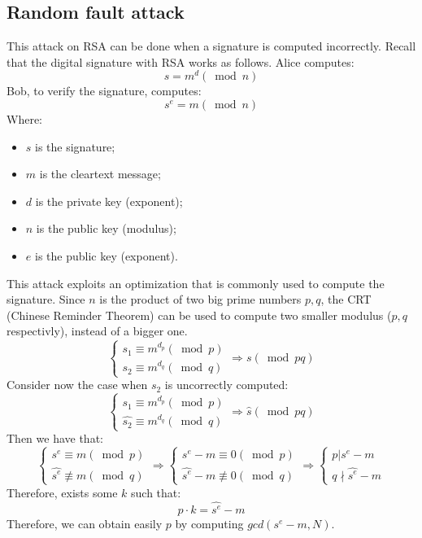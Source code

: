 \subsection{Random fault attack}
This attack on RSA can be done when a signature is computed incorrectly. \newline
Recall that the digital signature with RSA works as follows.\newline
Alice computes:
\[s = m^{d} (\bmod n)\]
Bob, to verify the signature, computes:
\[s^{e} = m (\bmod n)\]
Where:
\begin{itemize}
    \item $s$ is the signature;
    \item $m$ is the cleartext message;
    \item $d$ is the private key (exponent);
    \item $n$ is the public key (modulus);
    \item $e$ is the public key (exponent).
\end{itemize}
This attack exploits an optimization that is commonly used to compute the signature. \newline
Since $n$ is the product of two big prime numbers $p, q$, the CRT (Chinese Reminder Theorem) can be used to compute two smaller modulus ($p, q$ respectivly), instead of a bigger one.
\[
     \begin{cases}
       s_{1} \equiv m^{d_{p}} (\bmod p) \\
       s_{2} \equiv m^{d_{q}} (\bmod q)
     \end{cases}
     \Longrightarrow s (\bmod pq)
\]
Consider now the case when $s_{2}$ is uncorrectly computed:
\[
     \begin{cases}
       s_{1} \equiv m^{d_{p}} (\bmod p) \\
       \hat{s_{2}} \equiv m^{d_{q}} (\bmod q)
     \end{cases}
     \Longrightarrow \hat{s} (\bmod pq)
\]
Then we have that:
\[
     \begin{cases}
       s^{e} \equiv m (\bmod p) \\
       \hat{s^{e}} \not\equiv m (\bmod q)
     \end{cases}
     \Longrightarrow
     \begin{cases}
       s^{e} - m \equiv 0 (\bmod p)\\
       \hat{s^{e}} - m \not\equiv 0 (\bmod q)
     \end{cases}
     \Longrightarrow
     \begin{cases}
       p | s^{e} - m\\
       q \nmid \hat{s^{e}} - m
     \end{cases}
\]
Therefore, exists some $k$ such that:
\[p \cdot k = \hat{s^{e}} - m\]
Therefore, we can obtain easily $p$ by computing $gcd(s^{e} - m, N)$.

